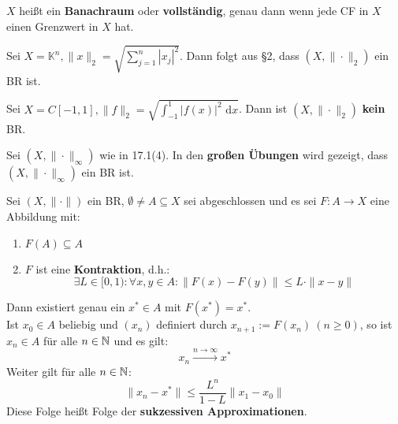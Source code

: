 \documentclass[a4paper,twoside,DIV15,BCOR12mm,chapterprefix=true,headings=twolinechapter]{scrbook}
\begin{document}
\begin{definition}
$X$ heißt ein \textbf{Banachraum} oder \textbf{vollständig}, genau dann wenn jede
CF in $X$ einen Grenzwert in $X$ hat.
\end{definition}

\begin{beispiele}
\item Sei $X=\mathbb{K}^n, \|x\|_2=\sqrt{\sum_{j=1}^n |x_j|^2}$. Dann folgt aus §2,
dass $(X,\|\cdot\|_2)$ ein BR ist.
\item Sei $X=C[-1,1], \|f\|_2=\sqrt{\int_{-1}^1 |f(x)|^2 \text{ d}x}$. Dann ist
$(X,\|\cdot\|_2)$ \textbf{kein} BR.
\item Sei $(X,\|\cdot\|_\infty)$ wie in 17.1(4). In den \textbf{\color{red}großen Übungen} wird gezeigt,
dass $(X,\|\cdot\|_\infty)$ ein BR ist.
\end{beispiele}

\begin{satz}
Sei $(X,\|\cdot\|)$ ein BR, $\emptyset\ne A\subseteq X$ sei abgeschlossen und es sei
$F:A\to X$ eine Abbildung mit:
\renewcommand{\labelenumi}{(\roman{enumi})}
\begin{enumerate}
\item $F(A)\subseteq A$
\item $F$ ist eine \textbf{Kontraktion}, d.h.:
\[\exists L\in[0,1):\forall x,y\in A:\|F(x)-F(y)\|\le L\cdot \|x-y\|\]
\end{enumerate}
\renewcommand{\labelenumi}{(\arabic{enumi})}
Dann existiert genau ein $x^*\in A$ mit $F(x^*)=x^*$.\\
Ist $x_0\in A$ beliebig und $(x_n)$ definiert durch $x_{n+1}:=F(x_n)\ (n\ge 0)$,
so ist $x_n\in A$ für alle $n\in\mathbb{N}$ und es gilt:
\[x_n\stackrel{n\to\infty}\to x^*\]
Weiter gilt für alle $n\in\mathbb{N}$:
\[\|x_n-x^*\|\le\frac{L^n}{1-L}\|x_1-x_0\|\]
Diese Folge heißt Folge der \textbf{sukzessiven Approximationen}.
\end{satz}
\end{document}
